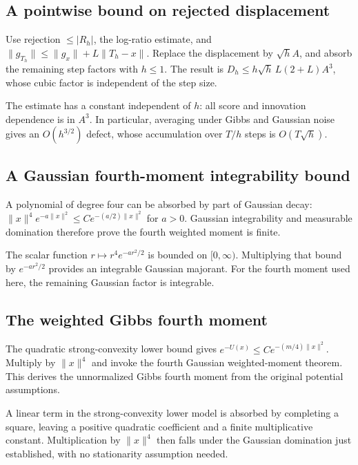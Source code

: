 \documentclass[11pt,a4paper]{article}
\begin{document}
\subsection{\texorpdfstring{A pointwise bound on rejected displacement}{A pointwise bound on rejected displacement}}


Use rejection \(\le|R_h|\), the log-ratio estimate, and \(\|g_{T_h}\|\le\|g_x\|+L\|T_h-x\|\). Replace the displacement by \(\sqrt hA\), and absorb the remaining step factors with \(h\le1\). The result is \(D_h\le h\sqrt h\,L(2+L)A^3\), whose cubic factor is independent of the step size.



The estimate has a constant independent of \(h\): all score and innovation dependence is in \(A^3\). In particular, averaging under Gibbs and Gaussian noise gives an \(O(h^{3/2})\) defect, whose accumulation over \(T/h\) steps is \(O(T\sqrt h)\).


\subsection{\texorpdfstring{A Gaussian fourth-moment integrability bound}{A Gaussian fourth-moment integrability bound}}


A polynomial of degree four can be absorbed by part of Gaussian decay: \(\|x\|^4e^{-a\|x\|^2}\le C e^{-(a/2)\|x\|^2}\) for \(a>0\). Gaussian integrability and measurable domination therefore prove the fourth weighted moment is finite.



The scalar function \(r\mapsto r^4e^{-ar^2/2}\) is bounded on \([0,\infty)\). Multiplying that bound by \(e^{-ar^2/2}\) provides an integrable Gaussian majorant. For the fourth moment used here, the remaining Gaussian factor is integrable.


\subsection{\texorpdfstring{The weighted Gibbs fourth moment}{The weighted Gibbs fourth moment}}


The quadratic strong-convexity lower bound gives \(e^{-U(x)}\le C e^{-(m/4)\|x\|^2}\). Multiply by \(\|x\|^4\) and invoke the fourth Gaussian weighted-moment theorem. This derives the unnormalized Gibbs fourth moment from the original potential assumptions.



A linear term in the strong-convexity lower model is absorbed by completing a square, leaving a positive quadratic coefficient and a finite multiplicative constant. Multiplication by \(\|x\|^4\) then falls under the Gaussian domination just established, with no stationarity assumption needed.
\end{document}
